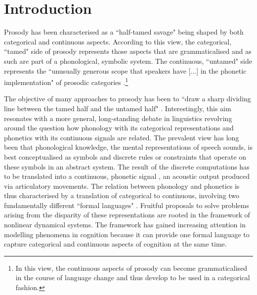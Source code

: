 \chapter{Introduction}
\label{chapter_intro}

Prosody has been characterised as a ``half-tamed savage" \citep[475]{Bolinger1978} being shaped by both categorical and continuous aspects. According to this view, the categorical, ``tamed" side of prosody represents those aspects that are grammaticalised and as such are part of a phonological, symbolic system. The continuous, ``untamed" side represents the ``unusually generous scope that speakers have [...] in the phonetic implementation" of prosodic categories \citep[49]{Gussenhoven2004}.\footnote{In this view, the continuous aspects of prosody can become grammaticalised in the course of language change and thus develop to be used in a categorical fashion.}

The objective of many approaches to prosody has been to ``draw a sharp dividing line between the tamed half and the untamed half" \citep[49]{Gussenhoven2004}. Interestingly, this aim resonates with a more general, long-standing debate in linguistics revolving around the question how phonology with its categorical representations and phonetics with its continuous signals are related. The prevalent view has long been that  phonological knowledge, the mental representations of speech sounds, is best conceptualised as symbols and discrete rules or constraints that operate on these symbols in an abstract system. The result of the discrete computations has to be translated into a continuous, phonetic signal \citep{Ladd2006}, an acoustic output produced via articulatory movements. The relation between phonology and phonetics is thus characterised by a translation of categorical to continuous, involving two fundamentally different ``formal languages" \citep[906]{GafosBenus2006}. Fruitful proposals to solve problems arising from the disparity of these representations are rooted in the framework of nonlinear dynamical systems. The framework has gained increasing attention in modelling phenomena in cognition \citep[among others][]{Kelso1995, vanGelderPort1995, Gafos2006, GafosBenus2006, Port2002, Spivey2007, ThelenSmith1994, Tulleretal1994} because it can provide one formal language to capture categorical and continuous aspects of cognition at the same time.

